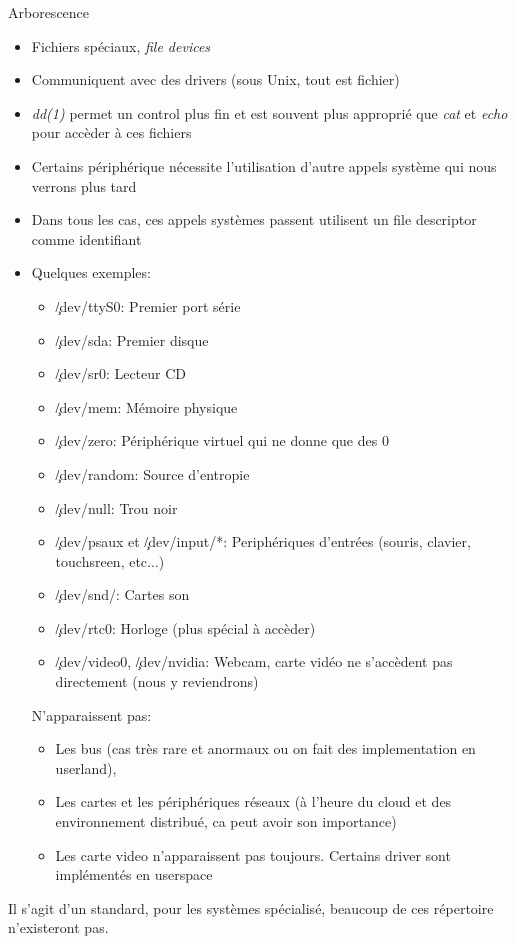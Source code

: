 \begin{frame}[fragile=singleslide]{Arborescence}
  \begin{itemize}
  \item Fichiers spéciaux, \emph{file devices}
  \item Communiquent avec des drivers (sous Unix, tout est fichier)
  \item \emph{dd(1)}  permet un control  plus fin et est  souvent plus
    approprié  que  \emph{cat}  et  \emph{echo}  pour  accèder  à  ces
    fichiers
  \item Certains  périphérique nécessite l'utilisation  d'autre appels
    système qui nous verrons plus tard
  \item Dans  tous les cas,  ces appels systèmes passent  utilisent un
    file descriptor comme identifiant
  \item Quelques exemples:
    \begin{itemize}
    \item \c{/dev/ttyS0}: Premier port série
    \item \c{/dev/sda}: Premier disque
    \item \c{/dev/sr0}: Lecteur CD
    \item \c{/dev/mem}: Mémoire physique
    \item \c{/dev/zero}: Périphérique virtuel qui ne donne que des 0
    \item \c{/dev/random}: Source d'entropie
    \item \c{/dev/null}: Trou noir
    \item \c{/dev/psaux}  et \c{/dev/input/*}: Periphériques d'entrées
      (souris, clavier, touchsreen, etc...)
    \item \c{/dev/snd/}: Cartes son
    \item \c{/dev/rtc0}: Horloge (plus spécial à accèder)
    \item  \c{/dev/video0}, \c{/dev/nvidia}:  Webcam,  carte vidéo  ne
      s'accèdent pas directement (nous y reviendrons)
    \end{itemize}
    N'apparaissent pas:
    \begin{itemize}
    \item Les bus (cas très rare et anormaux ou on fait des implementation
      en userland),
    \item Les cartes  et les périphériques réseaux (à  l'heure du cloud et
      des environnement distribué, ca peut avoir son importance)
    \item  Les carte  video n'apparaissent  pas toujours.  Certains driver
      sont implémentés en userspace
    \end{itemize}
  \end{itemize}
  Il s'agit  d'un standard, pour les systèmes  spécialisé, beaucoup de
  ces répertoire n'existeront pas.


\end{frame}
